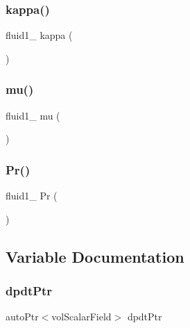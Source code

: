 \subsubsection{\texorpdfstring{kappa()}{kappa()}}
{\footnotesize\ttfamily fluid1\+\_\+ kappa (\begin{DoxyParamCaption}{ }\end{DoxyParamCaption})}

\mbox{\label{EEqns__2p_8H_a5f502f41f7fa5ac3329b38810d2514f6}} 
\subsubsection{\texorpdfstring{mu()}{mu()}}
{\footnotesize\ttfamily fluid1\+\_\+ mu (\begin{DoxyParamCaption}{ }\end{DoxyParamCaption})}

\mbox{\label{EEqns__2p_8H_ada5c16408b137a1f59af34049e925fc5}} 
\subsubsection{\texorpdfstring{Pr()}{Pr()}}
{\footnotesize\ttfamily fluid1\+\_\+ Pr (\begin{DoxyParamCaption}{ }\end{DoxyParamCaption})}



\subsection{Variable Documentation}
\mbox{\label{EEqns__2p_8H_a2e030fc31a779d82f33f3010af4a2ff8}} 
\subsubsection{\texorpdfstring{dpdt\+Ptr}{dpdtPtr}}
{\footnotesize\ttfamily auto\+Ptr$<$vol\+Scalar\+Field$>$ dpdt\+Ptr}



